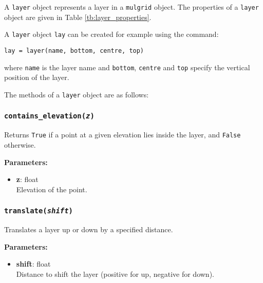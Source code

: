 A \texttt{layer} object represents a layer in a \texttt{mulgrid} object. The properties of a \texttt{layer} object are given in Table \ref{tb:layer_properties}.

A \texttt{layer} object \texttt{lay} can be created for example using the command:

\begin{lstlisting}
lay = layer(name, bottom, centre, top)
\end{lstlisting}

where \texttt{name} is the layer name and \texttt{bottom}, \texttt{centre} and \texttt{top} specify the vertical position of the layer.

The methods of a \texttt{layer} object are as follows:

\begin{snugshade}
\subsubsection{\texttt{contains\_elevation(\emph{z})}}
\end{snugshade}

Returns \texttt{True} if a point at a given elevation lies inside the layer, and \texttt{False} otherwise.

\textbf{Parameters:}
\begin{itemize}
\item \textbf{z}: float\\
   Elevation of the point.
\end{itemize}

\begin{snugshade}
\subsubsection{\texttt{translate(\emph{shift})}}
\end{snugshade}

Translates a layer up or down by a specified distance.

\textbf{Parameters:}
\begin{itemize}
\item \textbf{shift}: float\\
  Distance to shift the layer (positive for up, negative for down).
\end{itemize}

